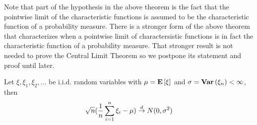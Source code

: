 Note that part of the hypothesis in the above theorem is the fact that
the pointwise limit of the characteristic functions is assumed to be
the characteristic function of a probability measure.  There is a stronger form of the above theorem that
characterizes when a pointwise limit of charactersistic functions is
in fact the characteristic function of a probability measure.  That
stronger result is not needed to prove the Central Limit Theorem so we
postpone its statement and proof until later.

\begin{thm}\label{CentralLimitTheorem}Let
  $\xi, \xi_1, \xi_2, \dots$ be i.i.d. random variables with $\mu =
  \textbf{E}\left[\xi\right]$ and 
  $\sigma = \textbf{Var} \left (\xi_n \right ) < \infty$, then 
\begin{align*}
\sqrt{n} (\frac{1}{n}\sum_{i=1}^n \xi_i -  \mu) \overset{d}\to N(0,\sigma^2)
\end{align*}
\end{thm}
